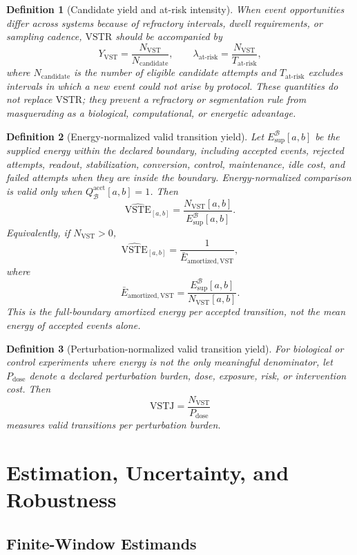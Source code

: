 \documentclass[11pt,a4paper]{article}
\newtheorem{definition}{Definition}
\newcommand{\VST}{\ensuremath{\mathrm{VST}}}
\newcommand{\VSTR}{\ensuremath{\mathrm{VSTR}}}
\newcommand{\VSTE}{\ensuremath{\mathrm{VSTE}}}
\newcommand{\VSTJ}{\ensuremath{\mathrm{VSTJ}}}
\newcommand{\1}{\mathbf{1}}
\begin{document}
\begin{definition}[Candidate yield and at-risk intensity]
When event opportunities differ across systems because of refractory intervals, dwell requirements, or sampling cadence, \VSTR{} should be accompanied by
\[
  Y_{\VST}=\frac{N_{\VST}}{N_{\mathrm{candidate}}},
  \qquad
  \lambda_{\mathrm{at\mbox{-}risk}}=
  \frac{N_{\VST}}{T_{\mathrm{at\mbox{-}risk}}},
\]
where $N_{\mathrm{candidate}}$ is the number of eligible candidate attempts and $T_{\mathrm{at\mbox{-}risk}}$ excludes intervals in which a new event could not arise by protocol. These quantities do not replace \VSTR{}; they prevent a refractory or segmentation rule from masquerading as a biological, computational, or energetic advantage.
\end{definition}

\begin{definition}[Energy-normalized valid transition yield]
Let $E_{\mathrm{sup}}^{\mathcal{B}}[a,b]$ be the supplied energy within the declared boundary, including accepted events, rejected attempts, readout, stabilization, conversion, control, maintenance, idle cost, and failed attempts when they are inside the boundary. Energy-normalized comparison is valid only when $Q_{\mathcal{B}}^{\mathrm{acct}}[a,b]=1$. Then
\[
  \widehat{\VSTE}_{[a,b]}=
  \frac{N_{\VST}[a,b]}{E_{\mathrm{sup}}^{\mathcal{B}}[a,b]}.
\]
Equivalently, if $N_{\VST}>0$,
\[
  \widehat{\VSTE}_{[a,b]} = \frac{1}{\bar{E}_{\mathrm{amortized,VST}}},
\]
where
\[
  \bar{E}_{\mathrm{amortized,VST}}
  =
  \frac{E_{\mathrm{sup}}^{\mathcal{B}}[a,b]}{N_{\VST}[a,b]}.
\]
This is the full-boundary amortized energy per accepted transition, not the mean energy of accepted events alone.
\end{definition}

\begin{definition}[Perturbation-normalized valid transition yield]
For biological or control experiments where energy is not the only meaningful denominator, let $P_{\mathrm{dose}}$ denote a declared perturbation burden, dose, exposure, risk, or intervention cost. Then
\[
  \VSTJ = \frac{N_{\VST}}{P_{\mathrm{dose}}}
\]
measures valid transitions per perturbation burden.
\end{definition}

\section{Estimation, Uncertainty, and Robustness}

\subsection{Finite-Window Estimands}
\end{document}
